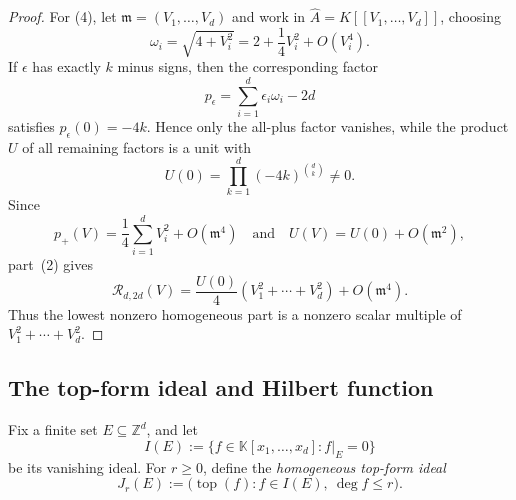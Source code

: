 \documentclass[11pt,reqno]{amsart}
\newcommand\K{\ensuremath{\mathbb{K}}}
\theoremstyle{definition}
\theoremstyle{plain}
\numberwithin{equation}{section}
\begin{document}
\begin{proof}
For (4), let $\mathfrak m=(V_1,\ldots,V_d)$ and work in
$\widehat A=K[[V_1,\ldots,V_d]]$, choosing
\begin{equation*}
    \omega_i=\sqrt{4+V_i^2}
    =2+\frac14V_i^2+O(V_i^4).
\end{equation*}
If $\epsilon$ has exactly $k$ minus signs, then the corresponding
factor
\begin{equation*}
    p_\epsilon=\sum_{i=1}^d\epsilon_i\omega_i-2d
\end{equation*}
satisfies $p_\epsilon(0)=-4k$. Hence only the all-plus factor vanishes,
while the product $U$ of all remaining factors is a unit with
\begin{equation*}
    U(0)=\prod_{k=1}^d(-4k)^{\binom dk}\neq0.
\end{equation*}
Since
\begin{equation*}
    p_+(V)
    =
    \frac14\sum_{i=1}^dV_i^2+O(\mathfrak m^4)
    \quad\text{and}\quad
    U(V)=U(0)+O(\mathfrak m^2),
\end{equation*}
part~\textup{(2)} gives
\begin{equation*}
    \mathcal{R}_{d,2d}(V)
    =
    \frac{U(0)}4
    \left(V_1^2+\cdots+V_d^2\right)
    +O(\mathfrak m^4).
\end{equation*}
Thus the lowest nonzero homogeneous part is a nonzero
scalar multiple of $V_1^2+\cdots+V_d^2$.    
\end{proof}

\subsection{The top-form ideal and Hilbert function}

Fix a finite set $E\subseteq\mathbb Z^d$, and let
\begin{equation*}
    I(E)
    :=
    \{f\in \K[x_1,\ldots,x_d]:f|_E=0\}
\end{equation*}
be its vanishing ideal. For $r\geq0$, define the \emph{homogeneous
top-form ideal}
\begin{equation}\label{eq:top-form-ideal}
    J_r(E)
    :=
    \bigl(
        \operatorname{top}(f):
        f\in I(E),\ \deg f\leq r
    \bigr).
\end{equation}
\end{document}
